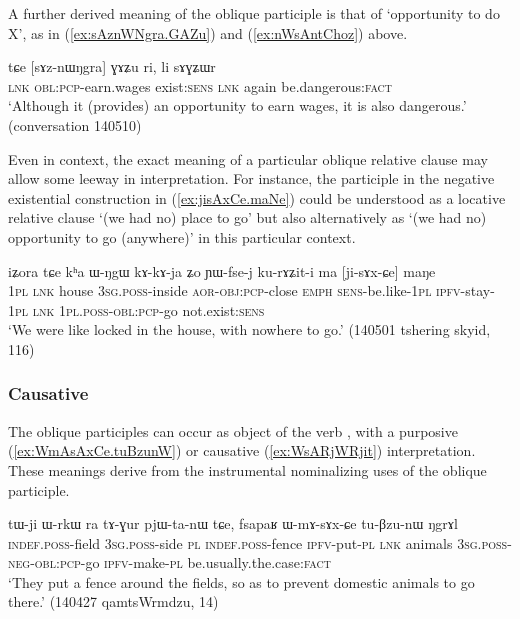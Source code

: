 A further derived meaning of the oblique participle is that of `opportunity to do X', as in (\ref{ex:sAznWNgra.GAZu}) and (\ref{ex:nWsAntChoz}) above.

\begin{exe}
\ex \label{ex:sAznWNgra.GAZu}
\gll tɕe [sɤz-nɯŋgra] ɣɤʑu ri, li sɤɣʑɯr \\
\textsc{lnk} \textsc{obl}:\textsc{pcp}-earn.wages exist:\textsc{sens} \textsc{lnk} again be.dangerous:\textsc{fact} \\
\glt `Although it (provides) an opportunity to earn wages, it is also dangerous.' (conversation 140510)
\end{exe}


Even in context, the exact meaning of a particular oblique relative clause may allow some leeway in interpretation. For instance, the participle  in the negative existential construction in (\ref{ex:jisAxCe.maNe}) could be understood as a locative relative clause `(we had no) place to go' but also alternatively as `(we had no) opportunity to go (anywhere)' in this particular context.

\begin{exe}
\ex \label{ex:jisAxCe.maNe}
\gll  iʑora tɕe kʰa ɯ-ŋgɯ kɤ-kɤ-ja ʑo ɲɯ-fse-j ku-rɤʑit-i ma [ji-sɤx-ɕe] maŋe \\
\textsc{1pl} \textsc{lnk} house \textsc{3sg}.\textsc{poss}-inside \textsc{aor}-\textsc{obj}:\textsc{pcp}-close \textsc{emph} \textsc{sens}-be.like-\textsc{1pl} \textsc{ipfv}-stay-\textsc{1pl} \textsc{lnk} \textsc{1pl}.\textsc{poss}-\textsc{obl}:\textsc{pcp}-go not.exist:\textsc{sens} \\
\glt  `We were like locked in the house, with nowhere to go.' (140501 tshering skyid, 116)
\end{exe}

\subsubsection{Causative} \label{sec:oblique.participle.causative}
The oblique participles can occur as object of the verb , with a purposive (\ref{ex:WmAsAxCe.tuBzunW}) or causative (\ref{ex:WsARjWRjit}) interpretation. These meanings derive from the instrumental nominalizing uses of the oblique participle. 

\begin{exe}
\ex \label{ex:WmAsAxCe.tuBzunW}
\gll tɯ-ji ɯ-rkɯ ra tɤ-ɣur pjɯ-ta-nɯ tɕe, fsapaʁ ɯ-mɤ-sɤx-ɕe tu-βzu-nɯ ŋgrɤl \\
\textsc{indef}.\textsc{poss}-field \textsc{3sg}.\textsc{poss}-side \textsc{pl} \textsc{indef}.\textsc{poss}-fence \textsc{ipfv}-put-\textsc{pl} \textsc{lnk} animals \textsc{3sg}.\textsc{poss}-\textsc{neg}-\textsc{obl}:\textsc{pcp}-go \textsc{ipfv}-make-\textsc{pl} be.usually.the.case:\textsc{fact} \\
\glt `They put a fence around the fields, so as to prevent domestic animals to go there.' (140427 qamtsWrmdzu, 14)
\end{exe}

